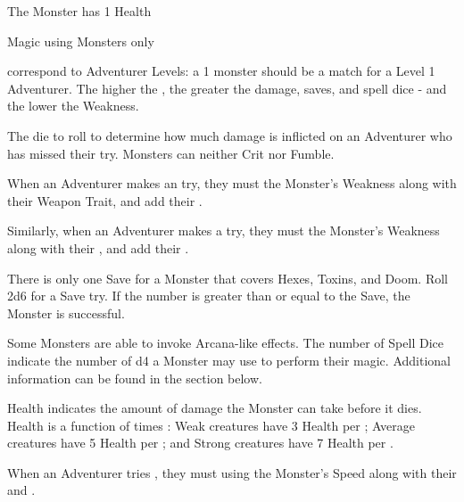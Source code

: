 {\footnotesize 
\Asterisk The Monster has 1 Health 

\Dagger Magic using Monsters only
\normalsize


\HD correspond to Adventurer Levels: a 1 \HD monster should be a match for a Level 1 Adventurer.  The higher the \HD, the greater the damage, saves, and spell dice - and the lower the Weakness.


The die to roll to determine how much damage is inflicted on an Adventurer who has missed their  try. Monsters can neither Crit nor Fumble.


When an Adventurer makes an  try, they must \RO the Monster's Weakness along with their Weapon Trait, and add their \LVL. 

Similarly, when an Adventurer makes a  try, they must \RO the Monster's Weakness along with their \DEX, and add their \LVL.


There is only one Save for a Monster that covers Hexes, Toxins, and Doom. Roll 2d6 for a Save try. If the number is greater than or equal to the Save, the Monster is successful. 
 

Some Monsters are able to invoke Arcana-like effects. The number of Spell Dice indicate the number of d4 a Monster may use to perform their magic. Additional information can be found in the  section below.


Health indicates the amount of damage the Monster can take before it dies. Health is a function of  times : Weak creatures have 3 Health per \HD; Average creatures have 5 Health per \HD; and Strong creatures have 7 Health per \HD. 


When an Adventurer tries , they must \RO using the Monster's Speed along with their \INT and \MD.

}
